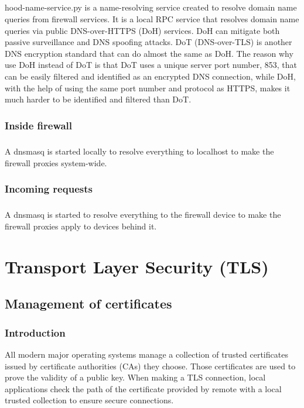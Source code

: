 \documentclass[mscthesis]{usiinfthesis}
\begin{document}
\paragraph{}
hood-name-service.py is a name-resolving service created to resolve domain name queries from firewall services. It is a local RPC service that resolves domain name queries via public DNS-over-HTTPS (DoH) services. DoH can mitigate both passive surveillance and DNS spoofing attacks\citep{rfc:doh8}. DoT (DNS-over-TLS) is another DNS encryption standard that can do almost the same as DoH. The reason why use DoH instead of DoT is that DoT uses a unique server port number, 853, that can be easily filtered and identified as an encrypted DNS connection, while DoH, with the help of using the same port number and protocol as HTTPS, makes it much harder to be identified and filtered than DoT.
\subsection{Inside firewall}
\paragraph{}
A dnsmasq is started locally to resolve everything to localhost to make the firewall proxies system-wide.
\subsection{Incoming requests}
\paragraph{}
A dnsmasq is started to resolve everything to the firewall device to make the firewall proxies apply to devices behind it.

\chapter{Transport Layer Security (TLS)}

\section{Management of certificates}

\subsection{Introduction}
All modern major operating systems manage a collection of trusted certificates issued by certificate authorities (CAs) they choose. Those certificates are used to prove the validity of a public key. When making a TLS connection, local applications check the path of the certificate provided by remote with a local trusted collection to ensure secure connections.
\end{document}
